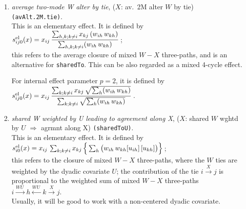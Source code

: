 \documentclass[a4paper,fleqn,11pt]{article}
\newcommand{\+}{\, + \,}
\newcommand{\vit}{\theenumi}
\begin{document}
\begin{enumerate}
 This can be regarded as a higher-order effect related to the \texttt{inPopOutW}
 effect (see below) as well as indegree-popularity.
 The differences between the centered and non-centered versions amount to
 a multiple of the indegree-popularity (without $\sqrt{}$) \texttt{inPop} effect.
 Therefore, when the \texttt{sharedTo} effect is used, it may be advisable
 also to include the \texttt{inPop}, \texttt{outActIntn}, and
 \texttt{inPopOutW} effects, so as to avoid misinterpretations.

 \item
 {\em average two-mode W alter by tie}, ($X$: av.\ 2M alter $W$ by tie)
        \texttt{(avAlt.2M.tie)}. \\[0.2em]
 This is an elementary effect.  It is defined by \\[0.4em]
 $s^{\rm el}_{ij\vit}(x) =  \displaystyle x_{ij}\, \frac{\sum_{h,k; k \neq i} x_{kj}\,
                  ( w_{ih}\, w_{kh} ) } {\sum_{h,k; k \neq i} ( w_{ih}\, w_{kh} ) } \,$;\\[0.2em]
 this refers to the average closure of mixed $W-X$ three-paths, and is an alternative for \texttt{sharedTo}.
 This can be also regarded as a mixed 4-cycle effect.

 For internal effect parameter $p=2$, it is defined by\\[0.4em]
 $s^{\rm el}_{ij\vit}(x) =  \displaystyle x_{ij}\, \frac{\sum_{k; k \neq i}  x_{kj}\, \sqrt{ \sum_h
                  ( w_{ih}\, w_{kh} ) }}
                   {\sum_{k; k \neq i} \sqrt{ \sum_h ( w_{ih}\, w_{kh} ) }} \,$.\\[0.2em]

 \item
\begin{minipage}[t]{.6\textwidth}
 {\em shared W weighted by U leading to agreement along X},
 ($X$: shared $W$ wghtd by $U$ $\Rightarrow$  agrmnt along X) \texttt{(sharedToU)}.\\[0.2em]
 This is an elementary effect.  It is defined by \\[0.4em]
 $s^{\rm el}_{i\vit}(x) = x_{ij}\, \sum_{k; k \neq i} x_{kj}\,
                 \Big\{ \sum_{h}   \big( w_{ih}\, w_{kh} [u_{ih}]\, [u_{kh}] \big )\Big\} \,$;\\[0.2em]
 this refers to the closure of mixed $W-X$ three-paths, where the $W$ ties
 are weighted by the dyadic covariate $U$;
 the contribution of the tie $i \stackrel{X}{\rightarrow} j$
 is proportional to  the weighted sum of mixed $W-X$ three-paths
 $i \stackrel{WU\,}{\longrightarrow} h  \stackrel{WU\,}{\longleftarrow} k  \stackrel{X}{\rightarrow} j$.\\
 Usually, it will be good to work with a non-centered dyadic covariate.


\end{minipage}
\end{enumerate}
\end{document}
